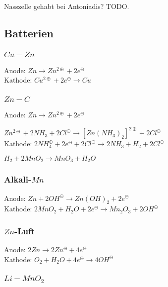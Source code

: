 Nasszelle gehabt bei Antoniadis? TODO.

\subsection{Batterien}


\subsubsection{$Cu-Zn$}

Anode: $Zn \rightarrow Zn^{2\oplus} + 2e^\ominus$\\

Kathode: $Cu^{2\oplus} + 2e^\ominus \rightarrow Cu$

\subsubsection{$Zn-C$}

Anode: $Zn \rightarrow Zn^{2\oplus} + 2e^\ominus$

$Zn^{2\oplus}+2NH_3+2Cl^\ominus \rightarrow [Zn(NH_3)_2]^{2\oplus}+2Cl^\ominus$\\

Kathode: $2NH_4^\oplus + 2e^\ominus + 2Cl^\ominus \rightarrow 2NH_3 + H_2 + 2Cl^\ominus$

$H_2 + 2MnO_2 \rightarrow MnO_3 + H_2O$

\subsubsection{Alkali-$Mn$}

Anode: $Zn + 2OH^\ominus \rightarrow Zn(OH)_2 + 2e^\ominus$\\

Kathode: $2MnO_2 + H_2O + 2e^\ominus \rightarrow Mn_2O_3+2OH^\ominus$

\subsubsection{$Zn$-Luft}

Anode: $2 Zn \rightarrow 2 Zn^\oplus + 4e^\ominus$\\

Kathode: $O_2 + H_2O + 4e^\ominus \rightarrow 4OH^\ominus$


\subsubsection{$Li-MnO_2$}

